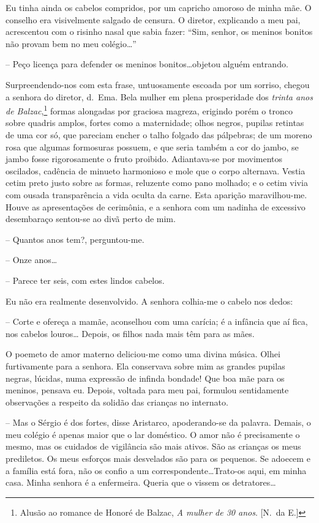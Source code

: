 Eu tinha ainda os cabelos compridos, por um capricho amoroso de minha mãe. O
conselho era visivelmente salgado de censura. O diretor, explicando a
meu pai, acrescentou com o risinho nasal que sabia fazer: ``Sim, senhor,
os meninos bonitos não provam bem no meu colégio\ldots'' 

-- Peço licença para defender os meninos bonitos\ldots objetou alguém entrando.

Surpreendendo{}-nos com esta frase, untuosamente escoada por um
sorriso, chegou a senhora do diretor, d.~Ema. Bela mulher em plena
prosperidade dos \textit{trinta anos de Balzac},\footnote{ Alusão ao romance de Honoré de Balzac, 
\textit{A mulher de 30 anos}. [N.~da E.]} 
formas alongadas por graciosa magreza, erigindo porém o tronco sobre
quadris amplos, fortes como a maternidade; olhos negros, pupilas
retintas de uma cor só, que pareciam encher o talho folgado das
pálpebras; de um moreno rosa que algumas formosuras possuem, e que
seria também a cor do jambo, se jambo fosse rigorosamente o fruto
proibido. Adiantava{}-se por movimentos oscilados, cadência de minueto
harmonioso e mole que o corpo alternava. Vestia cetim preto justo sobre
as formas, reluzente como pano molhado; e o cetim vivia com ousada
transparência a vida oculta da carne. Esta aparição maravilhou{}-me.
Houve as apresentações de cerimônia, e a senhora com um nadinha de
excessivo desembaraço sentou{}-se ao divã perto de mim. 

-- Quantos anos tem?, perguntou{}-me. 

-- Onze anos\ldots 

-- Parece ter seis, com estes lindos cabelos. 

Eu não era realmente desenvolvido. A senhora
colhia{}-me o cabelo nos dedos: 

-- Corte e ofereça a mamãe, aconselhou
com uma carícia; é a infância que aí fica, nos cabelos louros\ldots
Depois, os filhos nada mais têm para as mães. 

O poemeto de amor materno deliciou{}-me como uma divina música. Olhei furtivamente 
para a senhora. Ela conservava sobre mim as grandes pupilas negras, lúcidas,
numa expressão de infinda bondade! Que boa mãe para os meninos, pensava
eu. Depois, voltada para meu pai, formulou sentidamente observações a
respeito da solidão das crianças no internato. 

-- Mas o Sérgio é dos fortes, disse Aristarco, apoderando{}-se da palavra. 
Demais, o meu colégio é apenas maior que o lar doméstico. O amor não é precisamente o
mesmo, mas os cuidados de vigilância são mais ativos. São as crianças
os meus prediletos. Os meus esforços mais desvelados são para os
pequenos. Se adoecem e a família está fora, não os confio a um
correspondente\ldots Trato{}-os aqui, em minha casa. Minha senhora é a
enfermeira. Queria que o vissem os detratores\ldots 

